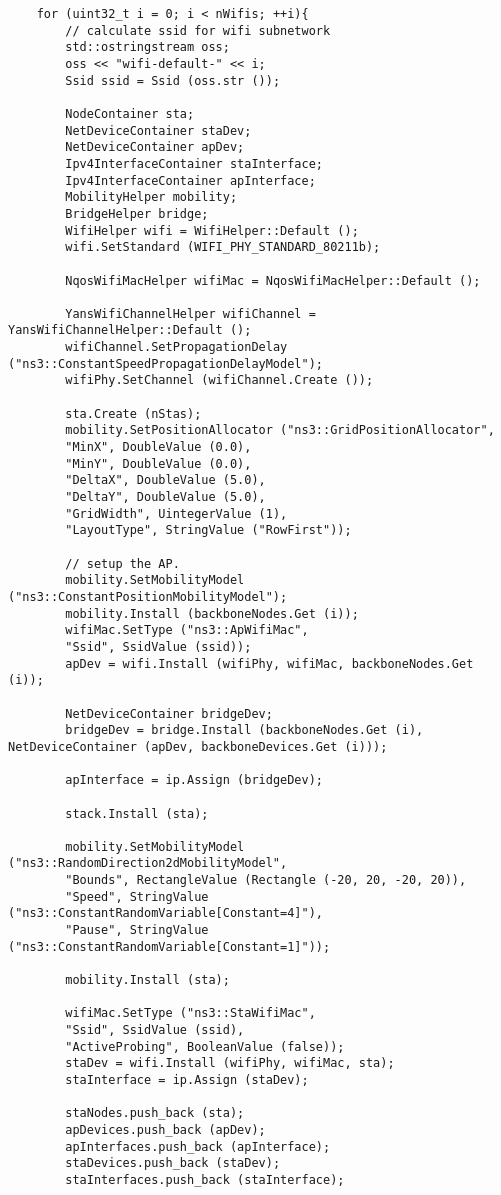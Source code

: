\begin{lstlisting}
	for (uint32_t i = 0; i < nWifis; ++i){
		// calculate ssid for wifi subnetwork
		std::ostringstream oss;
		oss << "wifi-default-" << i;
		Ssid ssid = Ssid (oss.str ());
		
		NodeContainer sta;
		NetDeviceContainer staDev;
		NetDeviceContainer apDev;
		Ipv4InterfaceContainer staInterface;
		Ipv4InterfaceContainer apInterface;
		MobilityHelper mobility;
		BridgeHelper bridge;
		WifiHelper wifi = WifiHelper::Default ();
		wifi.SetStandard (WIFI_PHY_STANDARD_80211b);
		
		NqosWifiMacHelper wifiMac = NqosWifiMacHelper::Default ();
		
		YansWifiChannelHelper wifiChannel = YansWifiChannelHelper::Default ();
		wifiChannel.SetPropagationDelay ("ns3::ConstantSpeedPropagationDelayModel");
		wifiPhy.SetChannel (wifiChannel.Create ());
		
		sta.Create (nStas);
		mobility.SetPositionAllocator ("ns3::GridPositionAllocator",
		"MinX", DoubleValue (0.0),
		"MinY", DoubleValue (0.0),
		"DeltaX", DoubleValue (5.0),
		"DeltaY", DoubleValue (5.0),
		"GridWidth", UintegerValue (1),
		"LayoutType", StringValue ("RowFirst"));
		
		// setup the AP.
		mobility.SetMobilityModel ("ns3::ConstantPositionMobilityModel");
		mobility.Install (backboneNodes.Get (i));
		wifiMac.SetType ("ns3::ApWifiMac",
		"Ssid", SsidValue (ssid));
		apDev = wifi.Install (wifiPhy, wifiMac, backboneNodes.Get (i));
		
		NetDeviceContainer bridgeDev;
		bridgeDev = bridge.Install (backboneNodes.Get (i), NetDeviceContainer (apDev, backboneDevices.Get (i)));
		
		apInterface = ip.Assign (bridgeDev);
		
		stack.Install (sta);
		
		mobility.SetMobilityModel ("ns3::RandomDirection2dMobilityModel",
		"Bounds", RectangleValue (Rectangle (-20, 20, -20, 20)),
		"Speed", StringValue ("ns3::ConstantRandomVariable[Constant=4]"),
		"Pause", StringValue ("ns3::ConstantRandomVariable[Constant=1]"));
		
		mobility.Install (sta);
		
		wifiMac.SetType ("ns3::StaWifiMac",
		"Ssid", SsidValue (ssid),
		"ActiveProbing", BooleanValue (false));
		staDev = wifi.Install (wifiPhy, wifiMac, sta);
		staInterface = ip.Assign (staDev);
		
		staNodes.push_back (sta);
		apDevices.push_back (apDev);
		apInterfaces.push_back (apInterface);
		staDevices.push_back (staDev);
		staInterfaces.push_back (staInterface);
		

\end{lstlisting}
